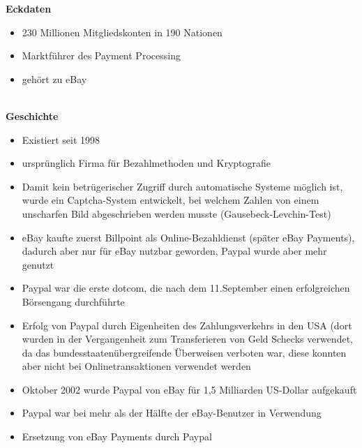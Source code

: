 \begin{itemize}
\textbf{Eckdaten}\
\begin{itemize}
\item 230 Millionen Mitgliedskonten in 190 Nationen
\item Marktführer des Payment Processing
\item gehört zu eBay
\end{itemize}
\\
%
%
\textbf{Geschichte}\\
\begin{itemize}
\item Existiert seit 1998
\item ursprünglich Firma für Bezahlmethoden und Kryptografie
\item Damit kein betrügerischer Zugriff durch automatische Systeme möglich ist, wurde ein Captcha-System entwickelt, bei welchem Zahlen von einem unscharfen Bild abgeschrieben werden musste (Gausebeck-Levchin-Test)
\item eBay kaufte zuerst Billpoint als Online-Bezahldienst (später eBay Payments), dadurch aber nur für eBay nutzbar geworden, Paypal wurde aber mehr genutzt
\item Paypal war die erste dotcom, die nach dem 11.September einen erfolgreichen Börsengang durchführte
\item Erfolg von Paypal durch Eigenheiten des Zahlungsverkehrs in den USA (dort wurden in der Vergangenheit zum Transferieren von Geld Schecks verwendet, da das bundesstaatenübergreifende Überweisen verboten war, diese konnten aber nicht bei Onlinetransaktionen verwendet werden
\item Oktober 2002 wurde Paypal von eBay für 1,5 Milliarden US-Dollar aufgekauft
\item Paypal war bei mehr als der Hälfte der eBay-Benutzer in Verwendung
\item Ersetzung von eBay Payments durch Paypal
\end{itemize}


\end{itemize}

